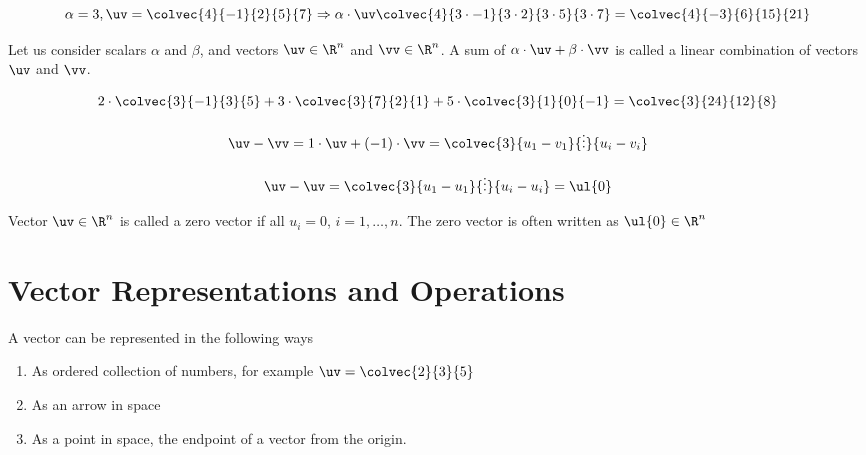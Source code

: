 \begin{example}
\[\alpha = 3, \uv = \colvec{4}{-1}{2}{5}{7}\Rightarrow \alpha\cdot\uv\colvec{4}{3\cdot -1}{3\cdot 2}{3\cdot 5}{3\cdot 7} = \colvec{4}{-3}{6}{15}{21} \]
\end{example}

\begin{definition}
	Let us consider scalars $\alpha$ and $\beta$, and vectors $\uv\in\R^n$ and $\vv\in\R^n$. A sum of $\alpha\cdot\uv + \beta\cdot\vv$ is called a linear combination of vectors $\uv$ and $\vv$.
\end{definition}

\begin{example}
\[2\cdot \colvec{3}{-1}{3}{5} + 3\cdot \colvec{3}{7}{2}{1} + 5\cdot \colvec{3}{1}{0}{-1} = \colvec{3}{24}{12}{8}\]
\end{example}

\begin{example}
\[\uv - \vv = 1\cdot \uv +(-1)\cdot \vv = \colvec{3}{u_1-v_1}{\vdots}{u_i-v_i}\]
\end{example}

\begin{note}
\[\uv - \uv = \colvec{3}{u_1-u_1}{\vdots}{u_i-u_i}=\ul{0} \]
\end{note}

\begin{definition}
	Vector $\uv\in\R^n$ is called a zero vector if all $u_i = 0$, $i=1,\dots,n$. The zero vector is often written as $\ul{0}\in\R^n$
\end{definition}

\section{Vector Representations and Operations}
A vector can be represented in the following ways
\begin{enumerate}
	\item As ordered collection of numbers, for example $\uv = \colvec{2}{3}{5}$
	\item As an arrow in space \begin{center}

	\end{center}

	\item As a point in space, the endpoint of a vector from the origin.
\end{enumerate}

